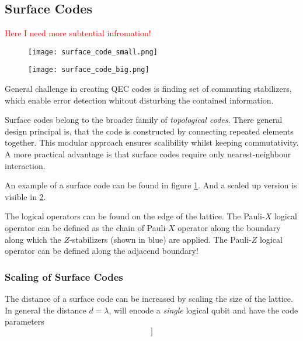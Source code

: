 \subsection{Surface Codes}
\textcolor{red}{Here I need more subtential infromation!}
\begin{figure}[h]
    \begin{center}
        \texttt{[image: surface\_code\_small.png]}
    \end{center}
    \label{fig:basic.qc.surface_code_small}
\end{figure}
\begin{figure}[h]
    \begin{center}
        \texttt{[image: surface\_code\_big.png]}
    \end{center}
    \label{fig:basic.qc.surface_code_big}
\end{figure}
General challenge in creating QEC codes is finding set of commuting stabilizers, 
which enable error detection whitout disturbing the contained information.

Surface codes belong to the broader family of \textit{topological codes}.
There general design principal is, that the code is constructed by connecting repeated elements together. 
This modular approach ensures scalibility whilst keeping commutativity.
A more practical advantage is that surface codes require only nearest-neighbour interaction. \cite{QECintro}

An example of a surface code can be found in figure \ref{fig:basic.qc.surface_code_small}.
And a scaled up version is visible in \ref{fig:basic.qc.surface_code_big}. \cite{QECintro}

The logical operators can be found on the edge of the lattice. 
The Pauli-$X$ logical operator can be defined as the chain of Pauli-$X$ operator along the boundary along which the $Z$-stabilizers (shown in blue) are applied.
The Pauli-$Z$ logical operator can be defined along the adjacend boundary! \cite{QECintro}

\subsubsection{Scaling of Surface Codes}
The distance of a surface code can be increased by scaling the size of the lattice.
In general the distance $d=\lambda$, will encode a \textit{single} logical qubit and have the code parameters \cite{QECintro}
\begin{equation}
    [[n = \lambda^2 + (\lambda-1)^2, k=1 ]]
\end{equation}


